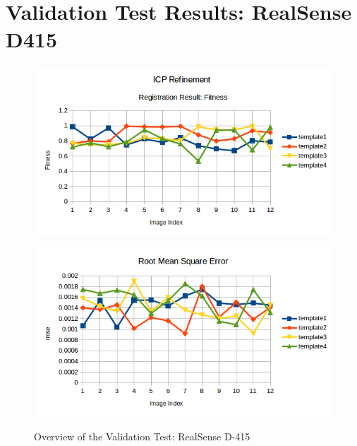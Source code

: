 \appendix
\chapter*{Validation Test Results: RealSense D415}
\label{chap:rsd415}


\begin{figure}[htp]
\begin{center}
{
  \includegraphics[clip,width=0.7\columnwidth]{figures/newreal_fitness.png}
}
\end{center}
\begin{center}
{
  \includegraphics[clip,width=0.7\columnwidth]{figures/newreal_rmse.png}
}
\end{center}
\caption{Overview of the Validation Test: RealSense D-415}
\label{setupsystem1}
\end{figure}



